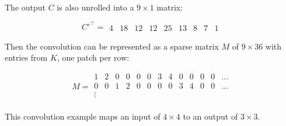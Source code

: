 The output $C$ is also unrolled into a $9 \times 1$ matrix:

$$
C'^\intercal =
\begin{matrix}
  4 & 18 & 12 & 12 & 25 & 13 & 8 & 7 & 1
\end{matrix}
$$

Then the convolution can be represented as a sparse matrix $M$ of $9 \times 36$ with entries from $K$,
one patch per row:

$$
M =
\begin{matrix}
  1 & 2 & 0 & 0 & 0 & 0 & 3 & 4 & 0 & 0 & 0 & 0 & \dots \\
  0 & 0 & 1 & 2 & 0 & 0 & 0 & 0 & 3 & 4 & 0 & 0 & \dots \\
  \vdots \\
\end{matrix}
$$

This convolution example maps an input of $4 \times 4$ to an output of $3 \times 3$. 

\clearpage %
